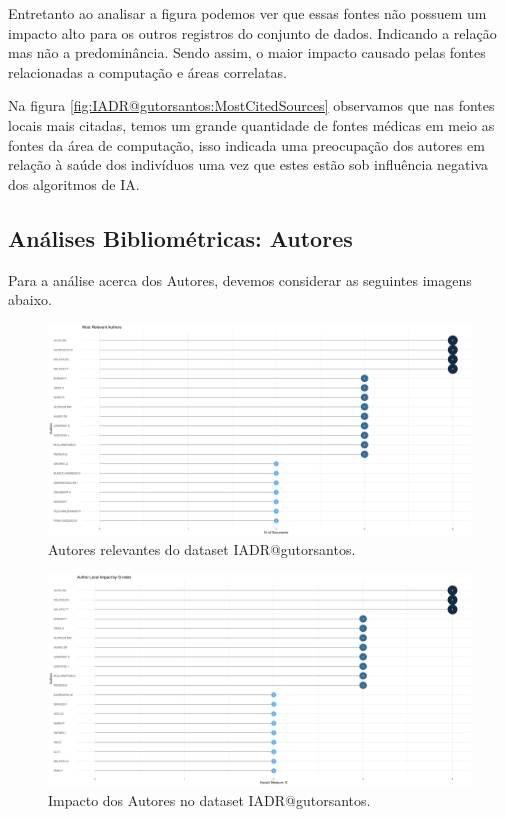 Entretanto ao analisar a figura podemos ver que essas fontes não possuem um impacto alto para os outros registros do conjunto de dados. Indicando a relação mas não a predominância. Sendo assim, o maior impacto causado pelas fontes relacionadas a computação e áreas correlatas.

Na figura \ref{fig:IADR@gutorsantos:MostCitedSources} observamos que nas fontes locais mais citadas, temos um grande quantidade de fontes médicas em meio as fontes da área de computação, isso indicada uma preocupação dos autores em relação à saúde dos indivíduos uma vez que estes estão sob influência negativa dos algoritmos de IA.

\subsection{Análises Bibliométricas: Autores}

Para a análise acerca dos Autores, devemos considerar as seguintes imagens abaixo.

\begin{figure}[H]
    \centering
    \includegraphics[angle=0,width=1\textwidth]{experiments/gutorsantos/AnaliseBibliometrica/IAeDiscriminacao/imgs/MostRelevantAuthors-2022-02-09.png}
    \caption{Autores relevantes do dataset IADR@gutorsantos.}
    \label{fig:IADR@gutorsantos:RelevantAuthors}
\end{figure}

\begin{figure}[H]
    \centering
    \includegraphics[angle=0,width=1\textwidth]{experiments/gutorsantos/AnaliseBibliometrica/IAeDiscriminacao/imgs/AuthorImpact-2022-02-09.png}
    \caption{Impacto dos Autores no dataset IADR@gutorsantos.}
    \label{fig:IADR@gutorsantos:AuthorsImpact}
\end{figure}

